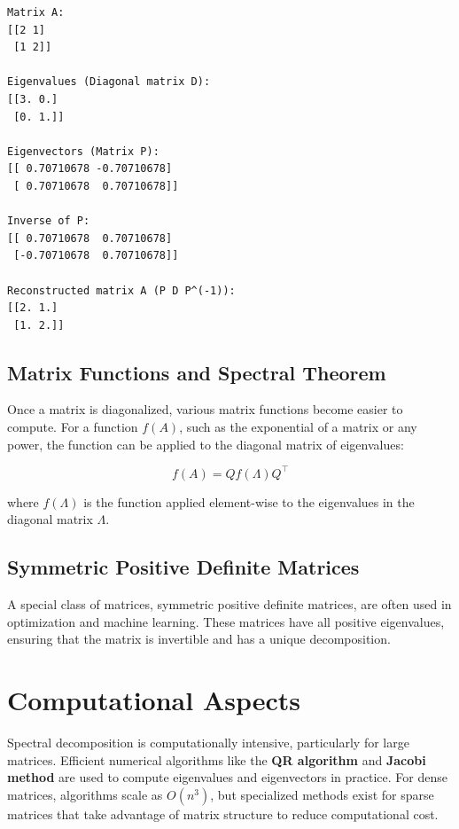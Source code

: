 \documentclass[
  letterpaper,
  DIV=11,
  numbers=noendperiod]{scrreprt}
\theoremstyle{plain}
\theoremstyle{definition}
\theoremstyle{remark}
\begin{document}
\begin{verbatim}
Matrix A:
[[2 1]
 [1 2]]

Eigenvalues (Diagonal matrix D):
[[3. 0.]
 [0. 1.]]

Eigenvectors (Matrix P):
[[ 0.70710678 -0.70710678]
 [ 0.70710678  0.70710678]]

Inverse of P:
[[ 0.70710678  0.70710678]
 [-0.70710678  0.70710678]]

Reconstructed matrix A (P D P^(-1)):
[[2. 1.]
 [1. 2.]]
\end{verbatim}

\subsection{Matrix Functions and Spectral
Theorem}\label{matrix-functions-and-spectral-theorem}

Once a matrix is diagonalized, various matrix functions become easier to
compute. For a function \(f(A)\), such as the exponential of a matrix or
any power, the function can be applied to the diagonal matrix of
eigenvalues:

\[
f(A) = Q f(\Lambda) Q^\top
\]

where \(f(\Lambda)\) is the function applied element-wise to the
eigenvalues in the diagonal matrix \(\Lambda\).

\subsection{Symmetric Positive Definite
Matrices}\label{symmetric-positive-definite-matrices}

A special class of matrices, symmetric positive definite matrices, are
often used in optimization and machine learning. These matrices have all
positive eigenvalues, ensuring that the matrix is invertible and has a
unique decomposition.

\section{Computational Aspects}\label{computational-aspects}

Spectral decomposition is computationally intensive, particularly for
large matrices. Efficient numerical algorithms like the \textbf{QR
algorithm} and \textbf{Jacobi method} are used to compute eigenvalues
and eigenvectors in practice. For dense matrices, algorithms scale as
\(O(n^3)\), but specialized methods exist for sparse matrices that take
advantage of matrix structure to reduce computational cost.
\end{document}
